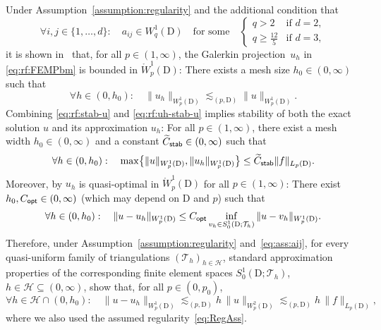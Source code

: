 \documentclass[reqno]{amsart}
\numberwithin{equation}{section}
\newcommand{\cH}{\mathcal{H}}
\newcommand{\cT}{\mathcal{T}}
\newcommand{\norm}[2]{     \| #1       \|_{ #2 }}
\newcommand{\dom}{\mathrm{D}}
\newcommand{\Wo}{\mathring{W}}
\theoremstyle{remark}
\theoremstyle{definition}
\begin{document}
Under Assumption~\ref{assumption:regularity} and 
the additional condition that 
% 
\begin{equation}\label{eq:ass:aij} 
\forall i,j\in\{1,\ldots,d\} : 
\quad 
a_{ij} \in W^1_q(\dom) 
\quad 
\text{for some} 
\quad 
\begin{cases}
q > 2 &\text{if } d = 2 ,\\
q\geq \frac{12}{5} &\text{if } d=3, 
\end{cases} 
\end{equation}
%
it is shown 
in~\cite[Theorem~8.5.3]{BrennerScott3rdEd} 
that, for all $p\in(1,\infty)$,  
the Galerkin projection~$u_h$ in \eqref{eq:rf:FEMPbm} 
is bounded in $\Wo^1_p(\dom)$:
There exists a mesh size    
$h_0 \in(0,\infty)$ such that 
%
\begin{equation}\label{eq:rf:uh-stab-u}
\forall h\in(0,h_0): 
\quad 
\norm{ u_h }{W^1_p(\dom)} 
\lesssim_{(p,\dom)} 
\norm{ u }{W^1_p(\dom)}. 
\end{equation}
%
Combining \eqref{eq:rf:stab-u} and \eqref{eq:rf:uh-stab-u} 
implies stability of both  
the exact solution $u$ and 
its approximation $u_h$: 
For all $p\in(1,\infty)$, there exist 
a mesh width 
$h_0\in(0,\infty)$ 
and a constant 
$\widetilde{C}_{\sf stab} 
\in (0,\infty)$ such that 
% 
\begin{equation}\label{eq:rf:stab} 
\forall h\in(0,h_0) : 
\quad 
\max\bigl\{ 
\norm{ u }{W^1_p(\dom)} ,  
\norm{ u_h }{W^1_p(\dom)} 
\bigr\} 
\leq 
\widetilde{C}_{\sf stab} 
\norm{ f }{L_p(\dom)} . 
\end{equation} 
% 
Moreover, by \cite[Equation~(8.5.4)]{BrennerScott3rdEd} 
$u_h$ is quasi-optimal in $\Wo^1_p(\dom)$ 
for all $p\in(1,\infty)$: 
There exist $h_0,C_{\sf opt}\in(0,\infty)$ 
(which may depend on $\dom$ and $p$)
such that 
%
\[ 
\forall h\in(0,h_0) : 
\quad 
\norm{ u - u_h }{W^1_p(\dom)} 
\leq 
C_{\sf opt} 
\inf_{v_h \in S^1_0(\dom;\cT_h)} 
\norm{ u - v_h }{W^1_p(\dom)} .
\] 
%
Therefore, 
under Assumption~\ref{assumption:regularity} 
and~\eqref{eq:ass:aij}, 
for every quasi-uniform family of 
triangulations $(\cT_h)_{h\in\cH}$, 
standard approximation properties
of the corresponding finite element 
spaces $S^1_0(\dom;\cT_h)$, 
$h\in\cH\subseteq(0,\infty)$, 
show that, for all $p\in(0,p_0)$, 
%
\begin{equation}\label{eq:rf:FEM-err}
\forall h\in\cH\cap(0,h_0) : 
\quad 
\norm{ u - u_h }{W^1_p(\dom)} 
\lesssim_{(p,\dom)} 
h \, \norm{ u }{W^2_p(\dom)} 
\lesssim_{(p,\dom)} 
h \, \norm{ f }{L_p(\dom)} , 
\end{equation}
%
where we also used the 
assumed regularity~\eqref{eq:RegAss}. 
\end{document}
